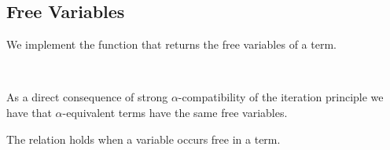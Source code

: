 \documentclass{entcs}
\newcommand{\alp}{\ensuremath{\alpha}}
\begin{document}
\subsection{Free Variables}
\label{sec:freevar}

We implement the function that returns the free variables of a term.


\begin{code}%
\> \AgdaSymbol{:}    \<%
\\
\> \AgdaSymbol{=}  \AgdaSymbol{(} \AgdaSymbol{)} \AgdaFunction{[\_]} \AgdaFunction{\_++\_} \AgdaSymbol{(}\AgdaInductiveConstructor{[]} \AgdaInductiveConstructor{,}      \AgdaFunction{-} \AgdaSymbol{)}\<%
\end{code}


\noindent As a direct consequence of strong \alp-compatibility of the iteration principle we have that \alp-equivalent terms have the same free variables. 

The relation \AgdaFunction{\_*\_} holds when a variable occurs free in a term.

\AgdaTarget{*}
\end{document}

